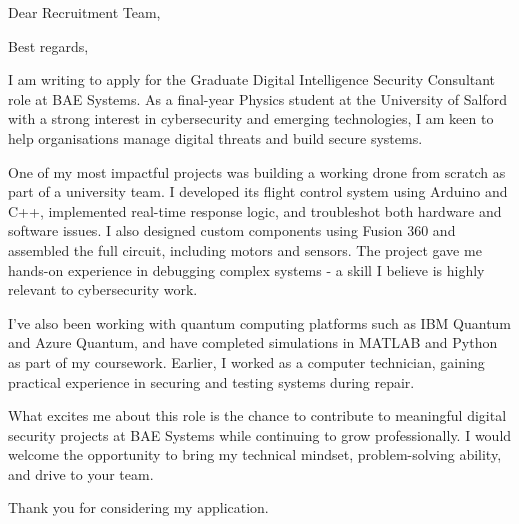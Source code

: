 \documentclass[11pt,a4paper,sans]{moderncv}
\begin{document}
\date{4 June 2025}
\opening{Dear Recruitment Team,}
\closing{Best regards,}
\makelettertitle

I am writing to apply for the Graduate Digital Intelligence Security Consultant role at BAE Systems. As a final-year Physics student at the University of Salford with a strong interest in cybersecurity and emerging technologies, I am keen to help organisations manage digital threats and build secure systems.

One of my most impactful projects was building a working drone from scratch as part of a university team. I developed its flight control system using Arduino and C++, implemented real-time response logic, and troubleshot both hardware and software issues. I also designed custom components using Fusion 360 and assembled the full circuit, including motors and sensors. The project gave me hands-on experience in debugging complex systems - a skill I believe is highly relevant to cybersecurity work.

I’ve also been working with quantum computing platforms such as IBM Quantum and Azure Quantum, and have completed simulations in MATLAB and Python as part of my coursework. Earlier, I worked as a computer technician, gaining practical experience in securing and testing systems during repair.

What excites me about this role is the chance to contribute to meaningful digital security projects at BAE Systems while continuing to grow professionally. I would welcome the opportunity to bring my technical mindset, problem-solving ability, and drive to your team.

Thank you for considering my application.

\makeletterclosing
\end{document}
